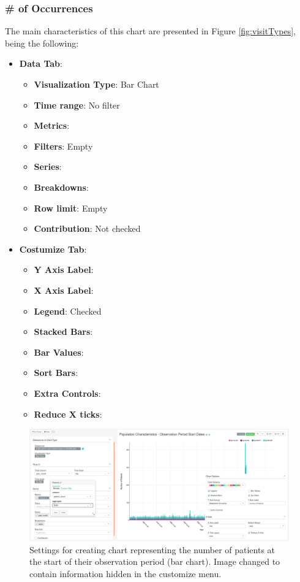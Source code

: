 \documentclass[]{book}
\providecommand{\tightlist}{%
  \setlength{\itemsep}{0pt}\setlength{\parskip}{0pt}}
\begin{document}
\subsubsection{\# of Occurrences}\label{of-occurrences}

The main characteristics of this chart are presented in Figure
\ref{fig:visitTypes}, being the following:

\begin{itemize}
\tightlist
\item
  \textbf{Data Tab}:

  \begin{itemize}
  \tightlist
  \item
    \textbf{Visualization Type}: Bar Chart
  \item
    \textbf{Time range}: No filter
  \item
    \textbf{Metrics}:
  \item
    \textbf{Filters}: Empty
  \item
    \textbf{Series}:
  \item
    \textbf{Breakdowns}:
  \item
    \textbf{Row limit}: Empty
  \item
    \textbf{Contribution}: Not checked
  \end{itemize}
\item
  \textbf{Costumize Tab}:

  \begin{itemize}
  \tightlist
  \item
    \textbf{Y Axis Label}:
  \item
    \textbf{X Axis Label}:
  \item
    \textbf{Legend}: Checked
  \item
    \textbf{Stacked Bars}:
  \item
    \textbf{Bar Values}:
  \item
    \textbf{Sort Bars}:
  \item
    \textbf{Extra Controls}:
  \item
    \textbf{Reduce X ticks}:
  \end{itemize}
\end{itemize}

\begin{figure}
\includegraphics[width=1\linewidth]{images/populationCharacteristicsObservationPeriodStartDates} \caption{Settings for creating chart representing the number of patients at the start of their observation period (bar chart). Image changed to contain information hidden in the customize menu.}\label{fig:visitTypes4}
\end{figure}
\end{document}
